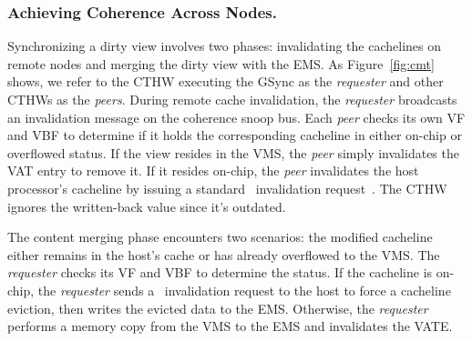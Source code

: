 
\subsubsection{Achieving Coherence Across Nodes. }

Synchronizing a dirty view involves two phases: invalidating the cachelines on remote nodes and merging the dirty view with the EMS.  
As Figure~\ref{fig:cmt} shows, we refer to the CTHW executing the GSync as the \textit{requester} and other CTHWs as the \textit{peers}. 
During remote cache invalidation, the \textit{requester} broadcasts an invalidation message on the coherence snoop bus. 
Each \textit{peer} checks its own VF and VBF to determine if it holds the corresponding cacheline in either on-chip or overflowed status. If the view resides in the VMS, the \textit{peer} simply invalidates the VAT entry to remove it. If it resides on-chip, the \textit{peer} invalidates the host processor's cacheline by issuing a standard \cxlbi~invalidation request~\cite{cxl-doc, cxl-shortdoc}. The CTHW ignores the written-back value since it's outdated. 

The content merging phase encounters two scenarios: the modified cacheline either remains in the host's cache or has already overflowed to the VMS. The \textit{requester} checks its VF and VBF to determine the status. If the cacheline is on-chip, the \textit{requester} sends a \cxlbi~invalidation request to the host to force a cacheline eviction, then writes the evicted data to the EMS. Otherwise, the \textit{requester} performs a memory copy from the VMS to the EMS and invalidates the VATE.





